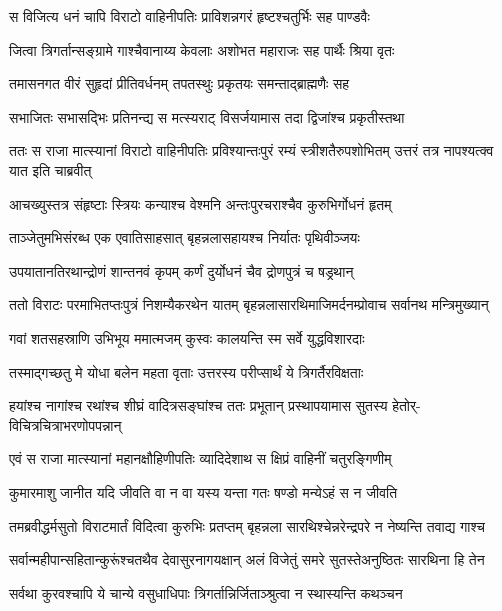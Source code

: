 \twolineshloka
{स विजित्य धनं चापि विराटो वाहिनीपतिः}
{प्राविशन्नगरं हृष्टश्चतुर्भिः सह पाण्डवैः}


\twolineshloka
{जित्वा त्रिगर्तान्सङ्ग्रामे गाश्चैवानाय्य केवलाः}
{अशोभत महाराजः सह पार्थैः श्रिया वृतः}


\twolineshloka
{तमासनगत वीरं सुहृदां प्रीतिवर्धनम्}
{तपतस्थुः प्रकृतयः समन्ताद्ब्राह्मणैः सह}


\twolineshloka
{सभाजितः सभासद्भिः प्रतिनन्द्य स मत्स्यराट्}
{विसर्जयामास तदा द्विजांश्च प्रकृतीस्तथा}


\threelineshloka
{ततः स राजा मात्स्यानां विराटो वाहिनीपतिः}
{प्रविश्यान्तःपुरं रम्यं स्त्रीशतैरुपशोभितम्}
{उत्तरं तत्र नापश्यत्क्व यात इति चाब्रवीत्}


\twolineshloka
{आचख्युस्तत्र संहृष्टाः स्त्रियः कन्याश्च वेश्मनि}
{अन्तःपुरचराश्चैव कुरुभिर्गोधनं हृतम्}


\twolineshloka
{ताञ्जेतुमभिसंरब्ध एक एवातिसाहसात्}
{बृहन्नलासहायश्च निर्यातः पृथिवीञ्जयः}


\twolineshloka
{उपयातानतिरथान्द्रोणं शान्तनवं कृपम्}
{कर्णं दुर्योधनं चैव द्रोणपुत्रं च षड्रथान्}


\twolineshloka
{ततो विराटः परमाभितप्तःपुत्रं निशम्यैकरथेन यातम्}
{बृहन्नलासारथिमाजिमर्दनम्प्रोवाच सर्वानथ मन्त्रिमुख्यान्}


\twolineshloka
{गवां शतसहस्राणि उभिभूय ममात्मजम्}
{कुस्वः कालयन्ति स्म सर्वे युद्धविशारदाः}


\twolineshloka
{तस्माद्गच्छतु मे योधा बलेन महता वृताः}
{उत्तरस्य परीप्सार्थं ये त्रिगर्तैरविक्षताः}



\fourlineindentedshloka
{हयांश्च नागांश्च रथांश्च शीघ्रं}
{वादित्रसङ्घांश्च ततः प्रभूतान्}
{प्रस्थापयामास सुतस्य हेतोर्-}
{विचित्रचित्राभरणोपपन्नान्}


\twolineshloka
{एवं स राजा मात्स्यानां महानक्षौहिणीपतिः}
{व्यादिदेशाथ स क्षिप्रं वाहिनीं चतुरङ्गिणीम्}


\twolineshloka
{कुमारमाशु जानीत यदि जीवति वा न वा}
{यस्य यन्ता गतः षण्डो मन्येऽहं स न जीवति}


\twolineshloka
{तमब्रवीद्धर्मसुतो विराटमार्तं विदित्वा कुरुभिः प्रतप्तम्}
{बृहन्नला सारथिश्चेन्नरेन्द्रपरे न नेष्यन्ति तवाद्य गाश्च}


\twolineshloka
{सर्वान्महीपान्सहितान्कुरूंश्चतथैव देवासुरनागयक्षान्}
{अलं विजेतुं समरे सुतस्तेअनुष्ठितः सारथिना हि तेन}


\twolineshloka
{सर्वथा कुरवश्चापि ये चान्ये वसुधाधिपाः}
{त्रिगर्तान्निर्जिताञ्श्रुत्वा न स्थास्यन्ति कथञ्चन}


